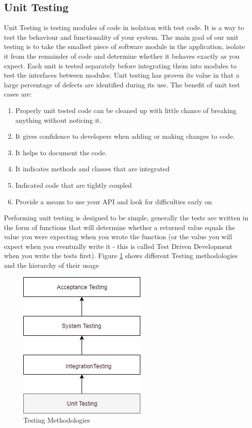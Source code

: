 \documentclass[article,type=msc,colorback,accentcolor=tud9c,twoside,11pt]{tudthesis}
\begin{document}
\subsection{Unit Testing}
Unit Testing\cite{EffectivnessofUnitTest} is testing modules of code in isolation with test code. It is a way to test the behaviour and functionality of your system. The main goal of our unit testing is to take the smallest piece of software module in the application, isolate it from the remainder of code and determine whether it behaves exactly as you expect. Each unit is tested separately before integrating them into modules to test the interfaces between modules. Unit testing has proven its value in that a large percentage of defects are identified during its use. The benefit of unit test cases are:
\begin{enumerate}
	\item Properly unit tested code can be cleaned up with little chance of breaking anything without noticing it.
	\item It gives confidence to developers when adding or making changes to code.
	\item It helps to document the code.
	\item It indicates methods and classes that are integrated 
	\item Indicated code that are tightly coupled
	\item Provide a means to use your API and look for difficulties early on 
\end{enumerate}
Performing unit testing is designed to be simple, generally the tests are written in the form of functions that will determine whether a returned value equals the value you were expecting when you wrote the function (or the value you will expect when you eventually write it - this is called Test Driven Development when you write the tests first). Figure \ref{fig:Testingmethodologies} shows different Testing methodologies and the hierarchy of their usage
\begin{figure}[h]
	\centering
	\includegraphics[scale=0.7]{Testing.jpg}
	\caption{Testing Methodologies}
	\label{fig:Testingmethodologies}
\end{figure}
\end{document}

